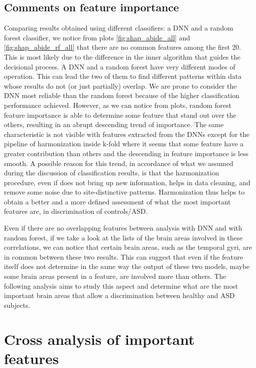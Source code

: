 \documentclass[11pt]{report}
\begin{document}
\subsection{Comments on feature importance}
Comparing results obtained using different classifiers: a DNN and a random forest classifier, we notice from plots \ref{fig:shap_abide_all} and \ref{fig:shap_abide_rf_all} that there are no common features among the first 20. 
This is most likely due to the difference in the inner algorithm that guides the decisional process. 
A DNN and a random forest have very different modes of operation. 
This can lead the two of them to find different patterns within data whose results do not (or just partially) overlap.
We are prone to consider the DNN most reliable than the random forest because of the higher classification performance achieved.
However, as we can notice from plots, random forest feature importance is able to determine some feature that stand out over the others, resulting in an abrupt descending trend of importance.
The same characteristic is not visible with features extracted from the DNNs except for the pipeline of harmonization inside k-fold where it seems that some feature have a greater contribution than others and the descending in feature importance is less smooth.
A possible reason for this trend, in accordance of what we assumed during the discussion of classification results, is that the harmonization procedure, even if does not bring up new information, helps in data cleaning, and remove some noise due to site-distinctive patterns.
Harmonization thus helps to obtain a better and a more defined assessment of what the most important features are, in discrimination of controls/ASD.

Even if there are no overlapping features between analysis with DNN and with random forest, if we take a look at the lists of the brain areas involved in these correlations, we can notice that certain brain areas, such as the temporal gyri, are in common between these two results.
This can suggest that even if the feature itself does not determine in the same way the output of these two models, maybe some brain areas present in a feature, are involved more than others.
The following analysis aims to study this aspect and determine what are the most important brain areas that allow a discrimination between healthy and ASD subjects.

\newpage
\section{Cross analysis of important features}\label{sec:feature_importance_5}
\end{document}
